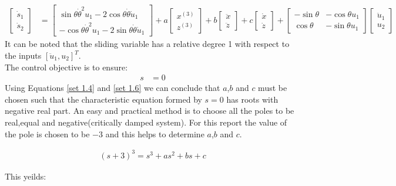 \documentclass{article}
\begin{document}
\begin{align}
\left[\begin{array}{cc}\dot{s}_1\\\dot{s}_2\end{array}\right] &= \left[\begin{array}{c}
\sin \theta \dot{\theta}^2u_1-2\cos \theta \dot{\theta}\dot{u}_1
\\-\cos \theta \dot{\theta}^2u_1-2\sin \theta \dot{\theta}\dot{u}_1
\end{array}\right] +a\left[\begin{array}{cc}x^{(3)}\\z^{(3)}\end{array}\right] + b\left[\begin{array}{cc}\ddot{x}\\\ddot{z}\end{array}\right] + c\left[\begin{array}{cc}\dot{x}\\\dot{z}\end{array}\right]+\left[\begin{array}{cc}-\sin\theta & -\cos \theta u_1\\
\cos \theta &-\sin \theta u_1 \end{array}\right] \left[\begin{array}{c}\ddot{u}_1\\u_2\end{array}\right] 
\ \label{set 1.5}
\end{align}
It can be noted that the sliding variable has  a relative degree 1 with respect to the inputs  $[\ddot{u}_1,u_2]^T$.\\

The control objective is to ensure:
\begin{align}
s&=0
\label{set 1.6}
\end{align}
Using Equations \ref{set 1.4} and \ref{set 1.6} we can conclude that $a$,$b$ and $c$ must be chosen such that the characteristic equation formed by $s=0$ has roots with negative real part. An easy and practical method is to choose all the poles to be real,equal and negative(critically damped system). For this report the value of the pole is chosen to be $-3$ and this helps to determine $a$,$b$ and $c$. 

\begin{align*}
(s+3)^3=s^3+as^2+bs+c
\end{align*}

This yeilds:
\end{document}
